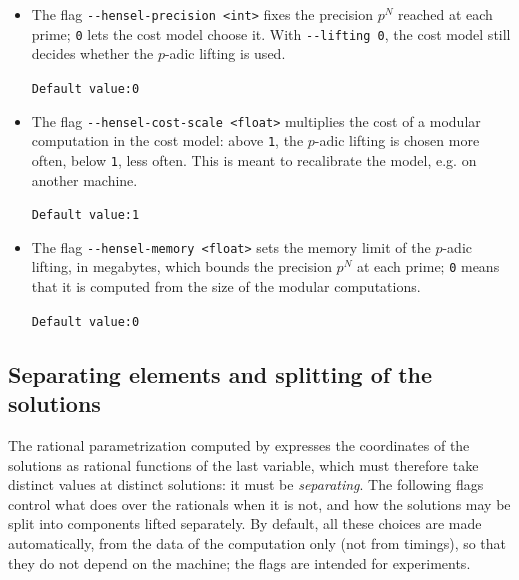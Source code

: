 \documentclass[a4paper,english,11pt]{scrartcl}
\theoremstyle{definition}
\theoremstyle{remark}
\begin{document}
\begin{itemize}
\item The flag \verb+--hensel-precision <int>+ fixes the precision $p^N$
  reached at each prime; \verb+0+ lets the cost model choose it. With
  \verb+--lifting 0+, the cost model still decides whether the $p$-adic
  lifting is used.

  \hfill \verb+Default value:0+

\item The flag \verb+--hensel-cost-scale <float>+ multiplies the cost of a
  modular computation in the cost model: above \verb+1+, the $p$-adic lifting
  is chosen more often, below \verb+1+, less often. This is meant to
  recalibrate the model, e.g. on another machine.

  \hfill \verb+Default value:1+

\item The flag \verb+--hensel-memory <float>+ sets the memory limit of the
  $p$-adic lifting, in megabytes, which bounds the precision $p^N$ at each
  prime; \verb+0+ means that it is computed from the size of the modular
  computations.

  \hfill \verb+Default value:0+
\end{itemize}

\subsection{Separating elements and splitting of the solutions}\label{sec:separating}

The rational parametrization computed by \msolve expresses the coordinates
of the solutions as rational functions of the last variable, which must
therefore take distinct values at distinct solutions: it must be
\emph{separating}. The following flags control what \msolve does over the
rationals when it is not, and how the solutions may be split into
components lifted separately. By default, all these choices are made
automatically, from the data of the computation only (not from timings),
so that they do not depend on the machine; the flags are intended for
experiments.
\end{document}

